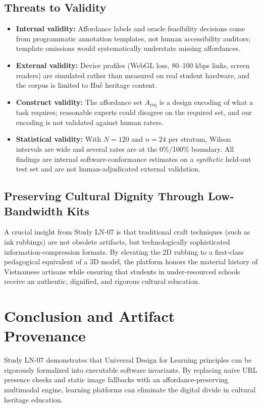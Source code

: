 \documentclass[11pt,a4paper]{article}
\begin{document}
\subsection{Threats to Validity}

\begin{itemize}
    \item \textbf{Internal validity:} Affordance labels and oracle feasibility decisions come from programmatic annotation templates, not human accessibility auditors; template omissions would systematically understate missing affordances.
    \item \textbf{External validity:} Device profiles (WebGL loss, 80--100 kbps links, screen readers) are simulated rather than measured on real student hardware, and the corpus is limited to Huế heritage content.
    \item \textbf{Construct validity:} The affordance set $A_{\text{req}}$ is a design encoding of what a task requires; reasonable experts could disagree on the required set, and our encoding is not validated against human raters.
    \item \textbf{Statistical validity:} With $N=120$ and $n=24$ per stratum, Wilson intervals are wide and several rates are at the 0\%/100\% boundary. All findings are internal software-conformance estimates on a \emph{synthetic} held-out test set and are not human-adjudicated external validation.
\end{itemize}

\subsection{Preserving Cultural Dignity Through Low-Bandwidth Kits}
A crucial insight from Study LN-07 is that traditional craft techniques (such as ink rubbings) are not obsolete artifacts, but technologically sophisticated information-compression formats. By elevating the 2D rubbing to a first-class pedagogical equivalent of a 3D model, the platform honors the material history of Vietnamese artisans while ensuring that students in under-resourced schools receive an authentic, dignified, and rigorous cultural education.

\section{Conclusion and Artifact Provenance}

Study LN-07 demonstrates that Universal Design for Learning principles can be rigorously formalized into executable software invariants. By replacing naive URL presence checks and static image fallbacks with an affordance-preserving multimodal engine, learning platforms can eliminate the digital divide in cultural heritage education.
\end{document}
